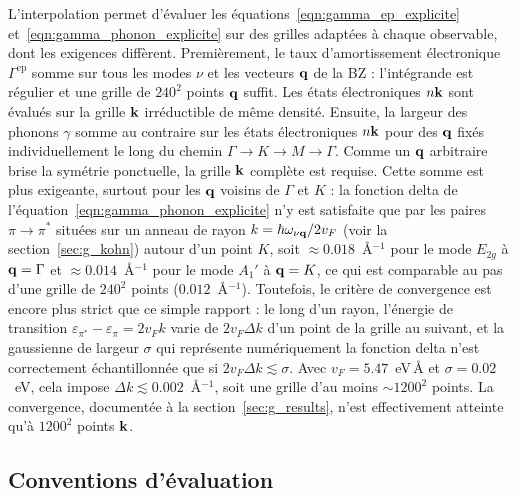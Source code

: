 L'interpolation permet d'évaluer les équations~\eqref{eqn:gamma_ep_explicite} et~\eqref{eqn:gamma_phonon_explicite} sur des grilles adaptées à chaque observable, dont les exigences diffèrent. Premièrement, le taux d'amortissement électronique $\Gamma^\text{ep}$ somme sur tous les modes $\nu$ et les vecteurs $\mathbf{q}$ de la BZ : l'intégrande est régulier et une grille de $240^2$ points $\mathbf{q}$ suffit. Les états électroniques $n\mathbf{k}$ sont évalués sur la grille $\mathbf{k}$ irréductible de même densité. Ensuite, la largeur des phonons $\gamma$ somme au contraire sur les états électroniques $n\mathbf{k}$ pour des $\mathbf{q}$ fixés individuellement le long du chemin $\Gamma\to K \to M\to \Gamma$. Comme un $\mathbf{q}$ arbitraire brise la symétrie ponctuelle, la grille $\mathbf{k}$ complète est requise. Cette somme est plus exigeante, surtout pour les $\mathbf{q}$ voisins de $\Gamma$ et $K$ : la fonction delta de l'équation~\eqref{eqn:gamma_phonon_explicite} n'y est satisfaite que par les paires $\pi\to\pi^*$ situées sur un anneau de rayon $k=\hbar\omega_{\nu\mathbf{q}}/2v_F$ (voir la section~\ref{sec:g_kohn}) autour d'un point $K$, soit $\approx 0.018$~\AA$^{-1}$ pour le mode $E_{2g}$ à $\mathbf{q}=\Gamma$ et $\approx 0.014$~\AA$^{-1}$ pour le mode $A_1'$ à $\mathbf{q}=K$, ce qui est comparable au pas d'une grille de $240^2$ points ($0.012$~\AA$^{-1}$). Toutefois, le critère de convergence est encore plus strict que ce simple rapport : le long d'un rayon, l'énergie de transition $\varepsilon_{\pi^*}-\varepsilon_{\pi}=2v_F k$ varie de $2v_F\Delta k$ d'un point de la grille au suivant, et la gaussienne de largeur $\sigma$ qui représente numériquement la fonction delta n'est correctement échantillonnée que si $2v_F\Delta k\lesssim\sigma$. Avec $v_F=5.47$~eV\,\AA{} et $\sigma=0.02$~eV, cela impose $\Delta k\lesssim 0.002$~\AA$^{-1}$, soit une grille d'au moins $\sim 1200^2$ points. La convergence, documentée à la section~\ref{sec:g_results}, n'est effectivement atteinte qu'à $1200^2$ points $\mathbf{k}$.

\subsection{Conventions d'évaluation}

